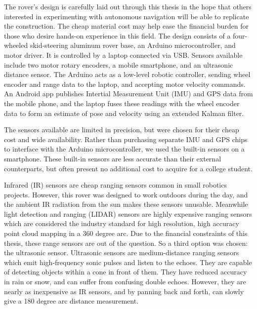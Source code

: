 
The rover's design is carefully laid out through this thesis in the hope that others interested in experimenting with autonomous navigation will be able to replicate the construction. The cheap material cost may help ease the financial burden for those who desire hands-on experience in this field. The design consists of a four-wheeled skid-steering aluminum rover base, an Arduino microcontroller, and motor driver. It is controlled by a laptop connected via USB. Sensors available include two motor rotary encoders, a mobile smartphone, and an ultrasonic distance sensor. The Arduino acts as a low-level robotic controller, sending wheel encoder and range data to the laptop, and accepting motor velocity commands. An Android app publishes Intertial Measurement Unit (IMU) and GPS data from the mobile phone, and the laptop fuses these readings with the wheel encoder data to form an estimate of pose and velocity using an extended Kalman filter.

The sensors available are limited in precision, but were chosen for their cheap cost and wide availability. Rather than purchasing separate IMU and GPS chips to interface with the Arduino microcontroller, we used the built-in sensors on a smartphone. These built-in sensors are less accurate than their external counterparts, but often present no additional cost to acquire for a college student.

Infrared (IR) sensors are cheap ranging sensors common in small robotics projects. However, this rover was designed to work outdoors during the day, and the ambient IR radiation from the sun makes these sensors unusable. Meanwhile light detection and ranging (LIDAR) sensors are highly expensive ranging sensors which are considered the industry standard for high resolution, high accuracy point cloud mapping in a 360 degree arc. Due to the financial constraints of this thesis, these range sensors are out of the question. So a third option was chosen: the ultrasonic sensor. Ultrasonic sensors are medium-distance ranging sensors which emit high-frequency sonic pulses and listen to the echoes. They are capable of detecting objects within a cone in front of them. They have reduced accuracy in rain or snow, and can suffer from confusing double echoes. However, they are nearly as inexpensive as IR sensors, and by panning back and forth, can slowly give a 180 degree arc distance measurement.

